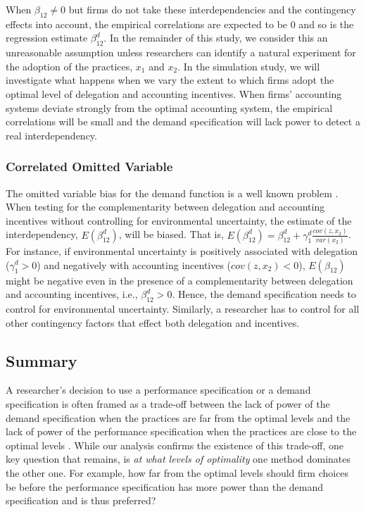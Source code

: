 \documentclass[12pt]{article}
\begin{document}
When $\beta_{12} \neq0$ but firms do not take these interdependencies and the contingency effects into account, the empirical correlations are expected to be 0 and so is the regression estimate $\beta_{12}^d$. In the remainder of this study, we consider this an unreasonable assumption unless researchers can identify a natural experiment for the adoption of the practices, $x_1$ and $x_2$. In the simulation study, we will investigate what happens when we vary the extent to which firms adopt the optimal level of delegation and accounting incentives. When firms' accounting systems deviate strongly from the optimal accounting system, the empirical correlations will be small and the demand specification will lack power to detect a real interdependency.

\subsubsection{Correlated Omitted Variable}

The omitted variable bias for the demand function is a well known problem \citep{arora_testing_1996,grabner_management_2013,hofmann_organizational_2017}. When testing for the complementarity between delegation and accounting incentives without controlling for environmental uncertainty, the estimate of the interdependency, $E(\beta_{12}^d)$, will be biased. That is, $E(\beta_{12}^d)=\beta_{12}^d+\gamma_{1}^d \frac{cov(z, x_2)}{var(x_2)}$. For instance, if environmental uncertainty is positively associated with delegation ($\gamma_{1}^d>0$) and negatively with accounting incentives ($cov(z, x_2)<0$), $E(\beta_{12})$ might be negative even in the presence of a complementarity between delegation and accounting incentives, i.e., $\beta_{12}^d>0$. Hence, the demand specification needs to control for environmental uncertainty. Similarly, a researcher has to control for all other contingency factors that effect both delegation and incentives.

\subsection{Summary}

A researcher's decision to use a performance specification or a demand specification is often framed as a trade-off between the lack of power of the demand specification when the practices are far from the optimal levels and the lack of power of the performance specification when the practices are close to the optimal levels \citep{grabner_management_2013, aral_three-way_2012,johansson_testing_2018}. While our analysis confirms the existence of this trade-off, one key question that remains, is \emph{at what levels of optimality} one method dominates the other one. For example, how far from the optimal levels should firm choices be before the performance specification has more power than the demand specification and is thus preferred?
\end{document}
